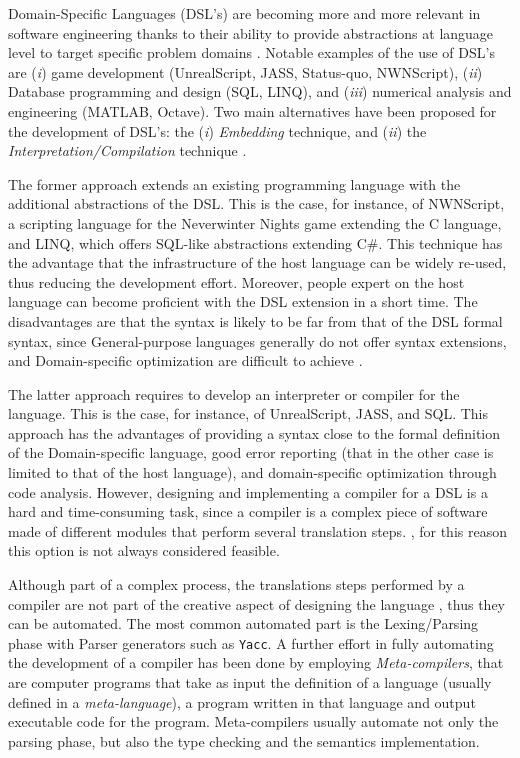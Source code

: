 Domain-Specific Languages (DSL's) are becoming more and more relevant in software engineering thanks to their ability to provide abstractions at language level to target specific problem domains \cite{van2000domain, voelter2013dsl}. Notable examples of the use of DSL's are (\textit{i}) game development (UnrealScript, JASS, Status-quo, NWNScript), (\textit{ii}) Database programming and design (SQL, LINQ), and (\textit{iii}) numerical analysis and engineering (MATLAB, Octave). Two main alternatives have been proposed for the development of DSL's: the (\textit{i}) \textit{Embedding} technique, and (\textit{ii}) the \textit{Interpretation/Compilation} technique \cite{mernik2005and}. 

The former approach extends an existing programming language with the additional abstractions of the DSL. This is the case, for instance, of NWNScript, a scripting language for the Neverwinter Nights game extending the C language, and LINQ, which offers SQL-like abstractions extending C\#. This technique has the advantage that the infrastructure of the host language can be widely re-used, thus reducing the development effort. Moreover, people expert on the host language can become proficient with the DSL extension in a short time. The disadvantages are that the syntax is likely to be far from that of the DSL formal syntax, since General-purpose languages generally do not offer syntax extensions, and Domain-specific optimization are difficult to achieve \cite{kamin1998research, sloane2002post}.

The latter approach requires to develop an interpreter or compiler for the language. This is the case, for instance, of UnrealScript, JASS, and SQL. This approach has the advantages of providing a syntax close to the formal definition of the Domain-specific language, good error reporting (that in the other case is limited to that of the host language), and domain-specific optimization through code analysis. However, designing and implementing a compiler for a DSL is a hard and time-consuming task, since a compiler is a complex piece of software made of different modules that perform several translation steps. \cite{aho1986compilers}, for this reason this option is not always considered feasible.

Although part of a complex process, the translations steps performed by a compiler are not part of the creative aspect of designing the language \cite{book1970cwic, czarnecki2000generative}, thus they can be automated. The most common automated part is the Lexing/Parsing phase with Parser generators such as \texttt{Yacc}. A further effort in fully automating the development of a compiler has been done by employing \textit{Meta-compilers}, that are computer programs that take as input the definition of a language (usually defined in a \textit{meta-language}), a program written in that language and output executable code for the program. Meta-compilers usually automate not only the parsing phase, but also the type checking and the semantics implementation.
 
